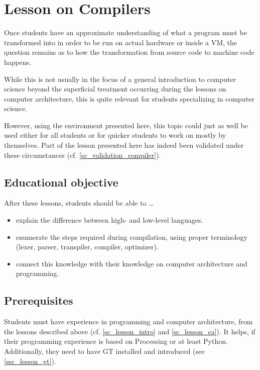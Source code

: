 \section{Lesson on Compilers} \label{sc_lesson_compiler}

Once students have an approximate understanding of what a program must be transformed into in order to be run on actual hardware or inside a \ac{VM}, the question remains as to how the transformation from source code to machine code happens.

While this is not usually in the focus of a general introduction to computer science beyond the superficial treatment occurring during the lessons on computer architecture, this is quite relevant for students specializing in computer science.

However, using the environment presented here, this topic could just as well be used either for all students or for quicker students to work on mostly by themselves. Part of the lesson presented here has indeed been validated under these circumstances (cf. \ref{sc_validation_compiler}).


\subsection{Educational objective}

After these lessons, students should be able to \dots
\begin{itemize}
\item explain the difference between high- and low-level languages.
\item enumerate the steps required during compilation, using proper terminology (lexer, parser, transpiler, compiler, optimizer).
\item connect this knowledge with their knowledge on computer architecture and programming.
\end{itemize}


\subsection{Prerequisites}

Students must have experience in programming and computer architecture, \eg from the lessons described above (cf. \ref{sc_lesson_intro} and \ref{sc_lesson_ca}). It helps, if their programming experience is based on Processing or at least Python. Additionally, they need to have \ac{GT} installed and introduced (see \ref{ssc_lesson_gt}).


